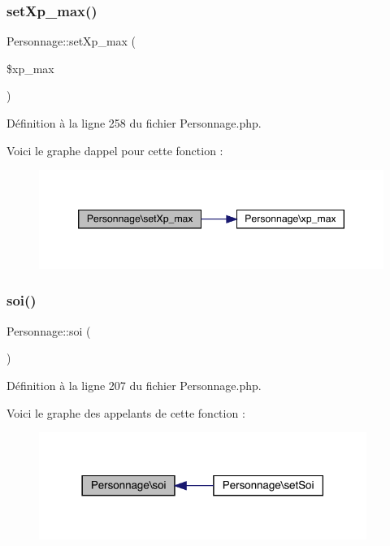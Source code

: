 \subsubsection{\texorpdfstring{set\+Xp\+\_\+max()}{setXp\_max()}}
{\footnotesize\ttfamily Personnage\+::set\+Xp\+\_\+max (\begin{DoxyParamCaption}\item[{}]{\$xp\+\_\+max }\end{DoxyParamCaption})}



Définition à la ligne 258 du fichier Personnage.\+php.

Voici le graphe d\textquotesingle{}appel pour cette fonction \+:\nopagebreak
\begin{figure}[H]
\begin{center}
\leavevmode
\includegraphics[width=346pt]{class_personnage_a19b9b5a7408d7d8b707e278e24af358f_cgraph}
\end{center}
\end{figure}
\mbox{\label{class_personnage_a389486b02c63dc7a404e873d21efa729}} 
\subsubsection{\texorpdfstring{soi()}{soi()}}
{\footnotesize\ttfamily Personnage\+::soi (\begin{DoxyParamCaption}{ }\end{DoxyParamCaption})}



Définition à la ligne 207 du fichier Personnage.\+php.

Voici le graphe des appelants de cette fonction \+:\nopagebreak
\begin{figure}[H]
\begin{center}
\leavevmode
\includegraphics[width=302pt]{class_personnage_a389486b02c63dc7a404e873d21efa729_icgraph}
\end{center}
\end{figure}
\mbox{\label{class_personnage_a1219171b9ddba0fecfa49995d7d71372}} 
